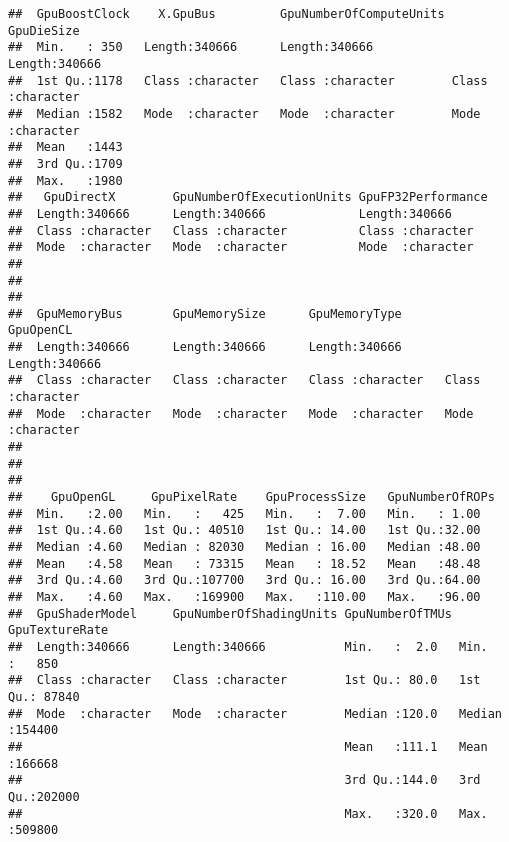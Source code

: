 \documentclass[
]{article}
\begin{document}
\begin{verbatim}
##  GpuBoostClock    X.GpuBus         GpuNumberOfComputeUnits  GpuDieSize       
##  Min.   : 350   Length:340666      Length:340666           Length:340666     
##  1st Qu.:1178   Class :character   Class :character        Class :character  
##  Median :1582   Mode  :character   Mode  :character        Mode  :character  
##  Mean   :1443                                                                
##  3rd Qu.:1709                                                                
##  Max.   :1980                                                                
##   GpuDirectX        GpuNumberOfExecutionUnits GpuFP32Performance
##  Length:340666      Length:340666             Length:340666     
##  Class :character   Class :character          Class :character  
##  Mode  :character   Mode  :character          Mode  :character  
##                                                                 
##                                                                 
##                                                                 
##  GpuMemoryBus       GpuMemorySize      GpuMemoryType       GpuOpenCL        
##  Length:340666      Length:340666      Length:340666      Length:340666     
##  Class :character   Class :character   Class :character   Class :character  
##  Mode  :character   Mode  :character   Mode  :character   Mode  :character  
##                                                                             
##                                                                             
##                                                                             
##    GpuOpenGL     GpuPixelRate    GpuProcessSize   GpuNumberOfROPs
##  Min.   :2.00   Min.   :   425   Min.   :  7.00   Min.   : 1.00  
##  1st Qu.:4.60   1st Qu.: 40510   1st Qu.: 14.00   1st Qu.:32.00  
##  Median :4.60   Median : 82030   Median : 16.00   Median :48.00  
##  Mean   :4.58   Mean   : 73315   Mean   : 18.52   Mean   :48.48  
##  3rd Qu.:4.60   3rd Qu.:107700   3rd Qu.: 16.00   3rd Qu.:64.00  
##  Max.   :4.60   Max.   :169900   Max.   :110.00   Max.   :96.00  
##  GpuShaderModel     GpuNumberOfShadingUnits GpuNumberOfTMUs GpuTextureRate  
##  Length:340666      Length:340666           Min.   :  2.0   Min.   :   850  
##  Class :character   Class :character        1st Qu.: 80.0   1st Qu.: 87840  
##  Mode  :character   Mode  :character        Median :120.0   Median :154400  
##                                             Mean   :111.1   Mean   :166668  
##                                             3rd Qu.:144.0   3rd Qu.:202000  
##                                             Max.   :320.0   Max.   :509800  

\end{verbatim}
\end{document}
